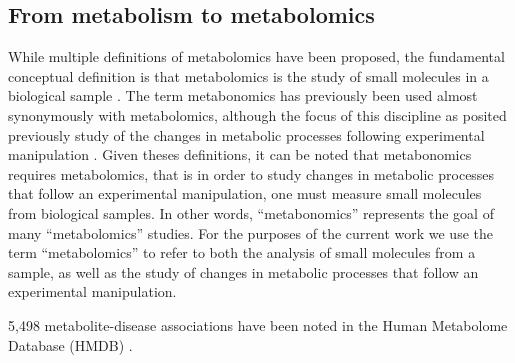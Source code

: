 \begin{DoubleSpace*}
\section{From metabolism to metabolomics}
While multiple definitions of metabolomics have been proposed, the fundamental conceptual definition is that metabolomics is the study of small molecules in a biological sample \cite{nicholson2008,johnson2016,newgard2017}. The term metabonomics has previously been used almost synonymously with metabolomics, although the focus of this discipline as posited previously study of the changes in metabolic processes following experimental manipulation \cite{nicholson2008}. Given theses definitions, it can be noted that metabonomics requires metabolomics, that is in order to study changes in metabolic processes that follow an experimental manipulation, one must measure small molecules from biological samples. In other words, ``metabonomics'' represents the goal of many ``metabolomics'' studies. For the purposes of the current work we use the term ``metabolomics'' to refer to both the analysis of small molecules from a sample, as well as the study of changes in metabolic processes that follow an experimental manipulation.

5,498 metabolite-disease associations have been noted in the Human Metabolome Database (HMDB) \cite{wishart2018}.


\end{DoubleSpace*}
